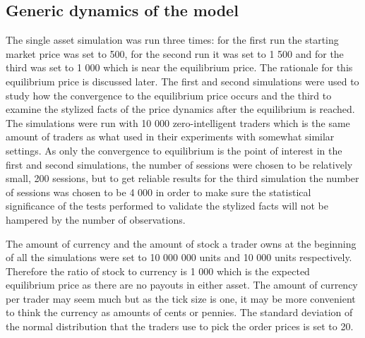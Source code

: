 \subsection{Generic dynamics of the model}
The single asset simulation was run three times: for the first run
the starting market price was set to 500, for the second run it
was set to 1 500 and for the third was set to 1 000 which is near the equilibrium price. 
The rationale for this equilibrium price is discussed later.
The first and second simulations were
used to study how the convergence to the equilibrium price occurs
and the third to examine the stylized facts of the price
dynamics after the equilibrium is reached. The simulations were
run with 10 000 zero-intelligent traders which is the 
same amount of traders as what \citet{Raberto05} used in their experiments
with somewhat similar settings. As only the convergence to equilibrium is 
the point of interest in the first and second simulations, the number of sessions
were chosen to be relatively small, 200 sessions, but to get reliable results for
the third simulation the number of sessions was chosen to be 4 000 in order to 
make sure the statistical significance of the tests performed to validate the 
stylized facts will not be hampered by the number of observations.

The amount of currency and the amount of stock 
a trader owns at the beginning of all the simulations were set to
10 000 000 units and 10 000 units respectively. Therefore
the ratio of stock to currency is 1 000 which
is the expected equilibrium price as there are
no payouts in either asset. The amount of currency
per trader may seem much but as the tick size is one,
it may be more convenient to think the currency as amounts
of cents or pennies. The standard deviation of
the normal distribution that the traders use to pick the order prices
is set to 20. %



